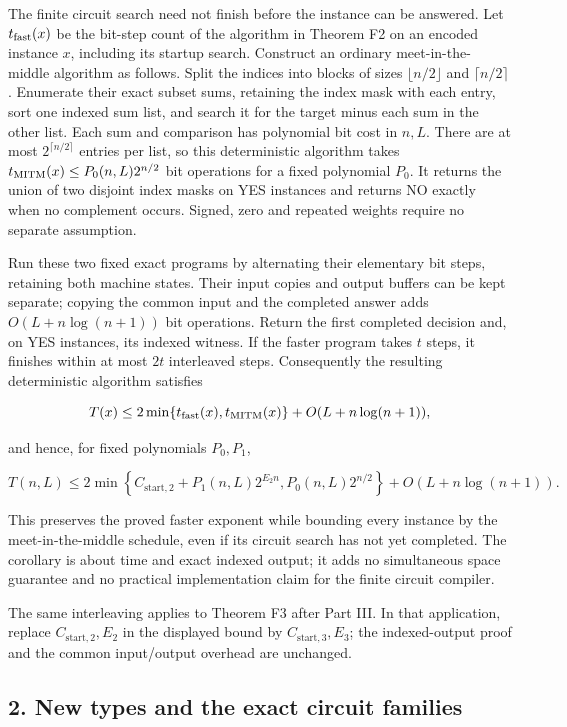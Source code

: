 The finite circuit search need not finish before the instance can be answered. Let \(t_{\rm fast}(x)\) be the bit-step count of the algorithm in Theorem F2 on an encoded instance \(x\), including its startup search. Construct an ordinary meet-in-the-middle algorithm as follows. Split the indices into blocks of sizes \(\lfloor n/2\rfloor\) and \(\lceil n/2\rceil\). Enumerate their exact subset sums, retaining the index mask with each entry, sort one indexed sum list, and search it for the target minus each sum in the other list. Each sum and comparison has polynomial bit cost in \(n,L\). There are at most \(2^{\lceil n/2\rceil}\) entries per list, so this deterministic algorithm takes \(t_{\rm MITM}(x)\le P_0(n,L)2^{n/2}\) bit operations for a fixed polynomial \(P_0\). It returns the union of two disjoint index masks on YES instances and returns NO exactly when no complement occurs. Signed, zero and repeated weights require no separate assumption.

Run these two fixed exact programs by alternating their elementary bit steps, retaining both machine states. Their input copies and output buffers can be kept separate; copying the common input and the completed answer adds \(O(L+n\log(n+1))\) bit operations. Return the first completed decision and, on YES instances, its indexed witness. If the faster program takes \(t\) steps, it finishes within at most \(2t\) interleaved steps. Consequently the resulting deterministic algorithm satisfies

\[
T(x)\le 2\min\{t_{\rm fast}(x),t_{\rm MITM}(x)\}
       +O(L+n\log(n+1)),
\]

and hence, for fixed polynomials \(P_0,P_1\),

\[
T(n,L)\le
2\min\left\{C_{\mathrm{start},2}+P_1(n,L)2^{E_2n},
           P_0(n,L)2^{n/2}\right\}
 +O(L+n\log(n+1)).
\]

This preserves the proved faster exponent while bounding every instance by the meet-in-the-middle schedule, even if its circuit search has not yet completed. The corollary is about time and exact indexed output; it adds no simultaneous space guarantee and no practical implementation claim for the finite circuit compiler.

The same interleaving applies to Theorem F3 after Part III. In that application, replace \(C_{\mathrm{start},2},E_2\) in the displayed bound by \(C_{\mathrm{start},3},E_3\); the indexed-output proof and the common input/output overhead are unchanged.

\hypertarget{af-a9ec399514-new-types-and-the-exact-circuit-families}{%
\subsection{2. New types and the exact circuit families}\label{af-a9ec399514-new-types-and-the-exact-circuit-families}}

